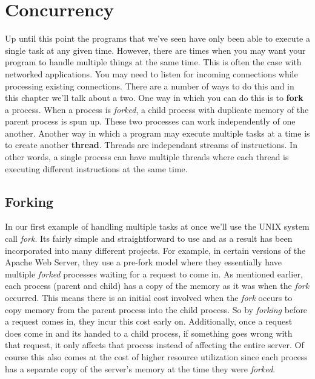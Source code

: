 \documentclass[../main.tex]{subfiles}
\begin{document}
	\chapter{Concurrency}\label{ch:7}
	Up until this point the programs that we've seen have only been able to execute a single task at any given time.  However, there are times when you may want your program to handle multiple things at the same time.  This is often the case with networked applications.  You may need to listen for incoming connections while processing existing connections.  There are a number of ways to do this and in this chapter we'll talk about a two.  
	One way in which you can do this is to \textbf{fork} a process.  When a process is \textit{forked}, a child process with duplicate memory of the parent process is spun up.  These two processes can work independently of one another.  Another way in which a program may execute multiple tasks at a time is to create another \textbf{thread}.  Threads are independant streams of instructions.  In other words, a single process can have multiple threads where each thread is executing different instructions at the same time.
	
	\section{Forking}
	In our first example of handling multiple tasks at once we'll use the UNIX system call \textit{fork}.  Its fairly simple and straightforward to use and as a result has been incorporated into many different projects.  For example, in certain versions of the Apache Web Server, they use a pre-fork model where they essentially have multiple \textit{forked} processes waiting for a request to come in.  As mentioned earlier, each process (parent and child) has a copy of the memory as it was when the \textit{fork} occurred.  This means there is an initial cost involved when the \textit{fork} occurs to copy memory from the parent process into the child process.  So by \textit{forking} before a request comes in, they incur this cost early on.  Additionally, once a request does come in and its handed to a child process, if something goes wrong with that request, it only affects that process instead of affecting the entire server.  Of course this also comes at the cost of higher resource utilization since each process has a separate copy of the server's memory at the time they were \textit{forked}.
	
\end{document}
